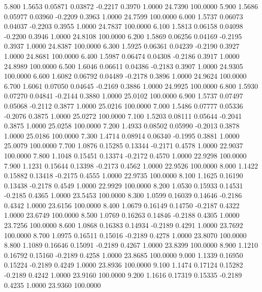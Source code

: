    5.800   1.5653   0.05871   0.03872  -0.2217   0.3970   1.0000  24.7390 100.0000
   5.900   1.5686   0.05977   0.03960  -0.2209   0.3963   1.0000  24.7599 100.0000
   6.000   1.5737   0.06073   0.04037  -0.2203   0.3955   1.0000  24.7837 100.0000
   6.100   1.5813   0.06158   0.04098  -0.2200   0.3946   1.0000  24.8108 100.0000
   6.200   1.5869   0.06256   0.04169  -0.2195   0.3937   1.0000  24.8387 100.0000
   6.300   1.5925   0.06361   0.04239  -0.2190   0.3927   1.0000  24.8681 100.0000
   6.400   1.5987   0.06474   0.04308  -0.2186   0.3917   1.0000  24.8989 100.0000
   6.500   1.6046   0.06611   0.04386  -0.2183   0.3907   1.0000  24.9305 100.0000
   6.600   1.6082   0.06792   0.04489  -0.2178   0.3896   1.0000  24.9624 100.0000
   6.700   1.6061   0.07050   0.04645  -0.2169   0.3886   1.0000  24.9925 100.0000
   6.800   1.5930   0.07270   0.04841  -0.2144   0.3880   1.0000  25.0102 100.0000
   6.900   1.5737   0.07497   0.05068  -0.2112   0.3877   1.0000  25.0216 100.0000
   7.000   1.5486   0.07777   0.05336  -0.2076   0.3875   1.0000  25.0272 100.0000
   7.100   1.5203   0.08111   0.05644  -0.2041   0.3875   1.0000  25.0258 100.0000
   7.200   1.4933   0.08502   0.05990  -0.2013   0.3878   1.0000  25.0186 100.0000
   7.300   1.4714   0.08914   0.06340  -0.1995   0.3881   1.0000  25.0079 100.0000
   7.700   1.0876   0.15285   0.13344  -0.2171   0.4578   1.0000  22.9037 100.0000
   7.800   1.1048   0.15451   0.13374  -0.2172   0.4570   1.0000  22.9298 100.0000
   7.900   1.1231   0.15644   0.13398  -0.2173   0.4562   1.0000  22.9526 100.0000
   8.000   1.1422   0.15882   0.13418  -0.2175   0.4555   1.0000  22.9735 100.0000
   8.100   1.1625   0.16190   0.13438  -0.2178   0.4549   1.0000  22.9929 100.0000
   8.200   1.0530   0.15933   0.14531  -0.2185   0.4365   1.0000  23.5453 100.0000
   8.300   1.0599   0.16039   0.14646  -0.2186   0.4342   1.0000  23.6156 100.0000
   8.400   1.0679   0.16149   0.14750  -0.2187   0.4322   1.0000  23.6749 100.0000
   8.500   1.0769   0.16263   0.14846  -0.2188   0.4305   1.0000  23.7256 100.0000
   8.600   1.0868   0.16383   0.14934  -0.2189   0.4291   1.0000  23.7692 100.0000
   8.700   1.0975   0.16511   0.15016  -0.2189   0.4278   1.0000  23.8070 100.0000
   8.800   1.1089   0.16646   0.15091  -0.2189   0.4267   1.0000  23.8399 100.0000
   8.900   1.1210   0.16792   0.15160  -0.2189   0.4258   1.0000  23.8685 100.0000
   9.000   1.1339   0.16950   0.15224  -0.2189   0.4249   1.0000  23.8936 100.0000
   9.100   1.1474   0.17124   0.15282  -0.2189   0.4242   1.0000  23.9160 100.0000
   9.200   1.1616   0.17319   0.15335  -0.2189   0.4235   1.0000  23.9360 100.0000

